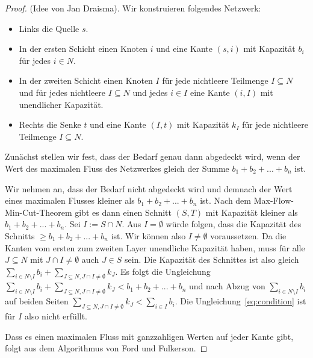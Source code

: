 \documentclass{article}
\begin{document}
	\begin{proof} 
		(Idee von Jan Draisma).
		Wir konstruieren folgendes Netzwerk:
		\begin{itemize}
			\item Links die Quelle $s$.
			\item In der ersten Schicht einen Knoten $i$ und eine Kante $(s, i)$ mit Kapazität $b_i$ für jedes $i\in N$.
			\item In der zweiten Schicht einen Knoten $I$ für jede nichtleere Teilmenge $I\subseteq N$ und für jedes nichtleere $I\subseteq N$ und jedes $i\in I$ eine Kante $(i, I)$ mit unendlicher Kapazität.
			\item Rechts die Senke $t$ und eine Kante $(I, t)$ mit Kapazität $k_I$ für jede nichtleere Teilmenge $I\subseteq N$.
		\end{itemize}
		Zunächst stellen wir fest, dass der Bedarf genau dann abgedeckt wird, wenn der Wert des maximalen Fluss des Netzwerkes gleich der Summe $b_1+b_2+...+b_n$ ist. 
		
		 Wir nehmen an, dass der Bedarf nicht abgedeckt wird und demnach der Wert eines maximalen Flusses kleiner als $b_1+b_2+...+b_n$ ist. Nach dem Max-Flow-Min-Cut-Theorem gibt es dann einen Schnitt $(S, T)$ mit Kapazität kleiner als $b_1+b_2+...+b_n$. Sei $I:=S\cap N$. Aus $I=\emptyset$ würde folgen, dass die Kapazität des Schnitts $\geq b_1+b_2+...+b_n$ ist. Wir können also $I\neq \emptyset$ voraussetzen. Da die Kanten vom ersten zum zweiten Layer unendliche Kapazität haben, muss für alle $J\subseteq N$ mit $J\cap I\neq \emptyset$ auch $J\in S$ sein. Die Kapazität des Schnittes ist also gleich $\sum_{i\in N\setminus I}b_i+\sum_{J\subseteq N, J\cap I\neq \emptyset}k_J$. Es folgt die Ungleichung
		$\sum_{i\in N\setminus I}b_i+\sum_{J\subseteq N, J\cap I\neq \emptyset}k_J < b_1+b_2+...+b_n$ und nach Abzug von $\sum_{i\in N\setminus I}b_i$ auf beiden Seiten $\sum_{J\subseteq N, J\cap I\neq \emptyset}k_J < \sum_{i\in I}b_i$. Die Ungleichung~\ref{eq:condition} ist für $I$ also nicht erfüllt.
		
		Dass es einen maximalen Fluss mit ganzzahligen Werten auf jeder Kante gibt, folgt aus dem Algorithmus von Ford und Fulkerson.
	\end{proof}
\end{document}
